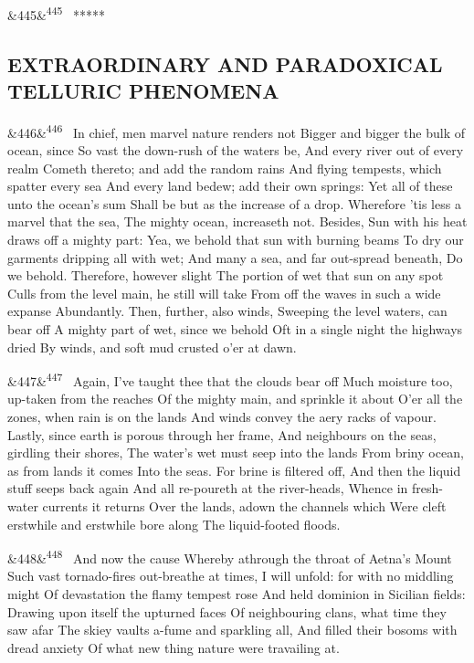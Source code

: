\documentclass[12pt]{article}
\newcommand{\para}[1][]{\par\noindent\ifx&#1&\else\textsuperscript{\footnotesize #1}~\fi}
\begin{document}
\para[445] *****

\subsection*{EXTRAORDINARY AND PARADOXICAL TELLURIC PHENOMENA}

\para[446] In chief, men marvel nature renders not Bigger and bigger the bulk of ocean, since So vast the down-rush of the waters be, And every river out of every realm Cometh thereto; and add the random rains And flying tempests, which spatter every sea And every land bedew; add their own springs: Yet all of these unto the ocean's sum Shall be but as the increase of a drop. Wherefore 'tis less a marvel that the sea, The mighty ocean, increaseth not. Besides, Sun with his heat draws off a mighty part: Yea, we behold that sun with burning beams To dry our garments dripping all with wet; And many a sea, and far out-spread beneath, Do we behold. Therefore, however slight The portion of wet that sun on any spot Culls from the level main, he still will take From off the waves in such a wide expanse Abundantly. Then, further, also winds, Sweeping the level waters, can bear off A mighty part of wet, since we behold Oft in a single night the highways dried By winds, and soft mud crusted o'er at dawn.

\para[447] Again, I've taught thee that the clouds bear off Much moisture too, up-taken from the reaches Of the mighty main, and sprinkle it about O'er all the zones, when rain is on the lands And winds convey the aery racks of vapour. Lastly, since earth is porous through her frame, And neighbours on the seas, girdling their shores, The water's wet must seep into the lands From briny ocean, as from lands it comes Into the seas. For brine is filtered off, And then the liquid stuff seeps back again And all re-poureth at the river-heads, Whence in fresh-water currents it returns Over the lands, adown the channels which Were cleft erstwhile and erstwhile bore along The liquid-footed floods.

\para[448] And now the cause Whereby athrough the throat of Aetna's Mount Such vast tornado-fires out-breathe at times, I will unfold: for with no middling might Of devastation the flamy tempest rose And held dominion in Sicilian fields: Drawing upon itself the upturned faces Of neighbouring clans, what time they saw afar The skiey vaults a-fume and sparkling all, And filled their bosoms with dread anxiety Of what new thing nature were travailing at.
\end{document}
